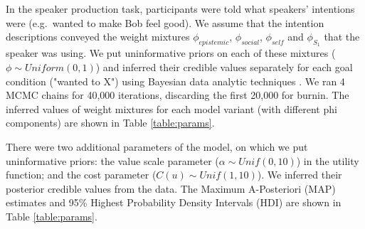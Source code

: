 \documentclass[12pt]{article}
\begin{document}
In the speaker production task, participants were told what speakers' intentions were 
(e.g.~wanted to make Bob feel good). 
We assume that the intention descriptions conveyed the weight mixtures $\phi_{epistemic}$, $\phi_{social}$, $\phi_{self}$ and $\phi_{S_1}$ that the speaker was using. 
We put uninformative priors on each of these mixtures ($\phi \sim Uniform(0,1)$) 
and inferred their credible values separately for each goal condition ("wanted to X") 
using Bayesian data analytic techniques \cite{lee2014}. 
We ran 4 MCMC chains for 40,000 iterations, discarding the first 20,000 for burnin. 
The inferred values of weight mixtures for each model variant (with different phi components) are shown in Table \ref{table:params}.

There were two additional parameters of the model, on which we put uninformative priors: the value scale parameter ($\alpha \sim Unif(0,10)$) in the utility function; and the cost parameter ($C(u) \sim Unif(1,10)$). We inferred their posterior credible values from the data. The Maximum A-Posteriori (MAP) estimates and 95\% Highest Probability Density Intervals (HDI) are shown in Table \ref{table:params}.
\end{document}
